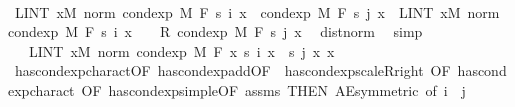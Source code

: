 \begin{isabellebody}
\ \ \ \ \isamarkupfalse%
\ {\isacharminus}{\kern0pt}\isanewline
\ \ \ \ \ \ \isamarkupfalse%
\ {\isachardoublequoteopen}LINT\ x{\isacharbar}{\kern0pt}M{\isachardot}{\kern0pt}\ norm\ {\isacharparenleft}{\kern0pt}cond{\isacharunderscore}{\kern0pt}exp\ M\ F\ {\isacharparenleft}{\kern0pt}s\ i{\isacharparenright}{\kern0pt}\ x\ {\isacharminus}{\kern0pt}\ cond{\isacharunderscore}{\kern0pt}exp\ M\ F\ {\isacharparenleft}{\kern0pt}s\ j{\isacharparenright}{\kern0pt}\ x{\isacharparenright}{\kern0pt}\ {\isacharequal}{\kern0pt}\ LINT\ x{\isacharbar}{\kern0pt}M{\isachardot}{\kern0pt}\ norm\ {\isacharparenleft}{\kern0pt}cond{\isacharunderscore}{\kern0pt}exp\ M\ F\ {\isacharparenleft}{\kern0pt}s\ i{\isacharparenright}{\kern0pt}\ x\ {\isacharplus}{\kern0pt}\ {\isacharminus}{\kern0pt}\ {}\ {\isacharasterisk}{\kern0pt}\isactrlsub R\ cond{\isacharunderscore}{\kern0pt}exp\ M\ F\ {\isacharparenleft}{\kern0pt}s\ j{\isacharparenright}{\kern0pt}\ x{\isacharparenright}{\kern0pt}{\isachardoublequoteclose}\ \isamarkupfalse%
\ dist{\isacharunderscore}{\kern0pt}norm\ \isamarkupfalse%
\ simp\isanewline
\ \ \ \ \ \ \isamarkupfalse%
\ \isamarkupfalse%
\ {\isachardoublequoteopen}{\isachardot}{\kern0pt}{\isachardot}{\kern0pt}{\isachardot}{\kern0pt}\ {\isacharequal}{\kern0pt}\ LINT\ x{\isacharbar}{\kern0pt}M{\isachardot}{\kern0pt}\ norm\ {\isacharparenleft}{\kern0pt}cond{\isacharunderscore}{\kern0pt}exp\ M\ F\ {\isacharparenleft}{\kern0pt}{\isasymlambda}x{\isachardot}{\kern0pt}\ s\ i\ x\ {\isacharminus}{\kern0pt}\ s\ j\ x{\isacharparenright}{\kern0pt}\ x{\isacharparenright}{\kern0pt}{\isachardoublequoteclose}\ \isamarkupfalse%
\ has{\isacharunderscore}{\kern0pt}cond{\isacharunderscore}{\kern0pt}exp{\isacharunderscore}{\kern0pt}charact{\isacharparenleft}{\kern0pt}{}{\isacharparenright}{\kern0pt}{\isacharbrackleft}{\kern0pt}OF\ has{\isacharunderscore}{\kern0pt}cond{\isacharunderscore}{\kern0pt}exp{\isacharunderscore}{\kern0pt}add{\isacharbrackleft}{\kern0pt}OF\ {\isacharunderscore}{\kern0pt}\ has{\isacharunderscore}{\kern0pt}cond{\isacharunderscore}{\kern0pt}exp{\isacharunderscore}{\kern0pt}scaleR{\isacharunderscore}{\kern0pt}right{\isacharcomma}{\kern0pt}\ OF\ has{\isacharunderscore}{\kern0pt}cond{\isacharunderscore}{\kern0pt}exp{\isacharunderscore}{\kern0pt}charact{\isacharparenleft}{\kern0pt}{}{\isacharcomma}{\kern0pt}{}{\isacharparenright}{\kern0pt}{\isacharcomma}{\kern0pt}\ OF\ has{\isacharunderscore}{\kern0pt}cond{\isacharunderscore}{\kern0pt}exp{\isacharunderscore}{\kern0pt}simple{\isacharparenleft}{\kern0pt}{}{\isacharcomma}{\kern0pt}{}{\isacharparenright}{\kern0pt}{\isacharbrackleft}{\kern0pt}OF\ assms{\isacharparenleft}{\kern0pt}{}{\isacharcomma}{\kern0pt}{}{\isacharparenright}{\kern0pt}{\isacharbrackright}{\kern0pt}{\isacharbrackright}{\kern0pt}{\isacharcomma}{\kern0pt}\ THEN\ AE{\isacharunderscore}{\kern0pt}symmetric{\isacharcomma}{\kern0pt}\ of\ i\ {\isachardoublequoteopen}{\isacharminus}{\kern0pt}{}{\isachardoublequoteclose}\ j{\isacharbrackright}{\kern0pt}\ \isamarkupfalse%

\end{isabellebody}
